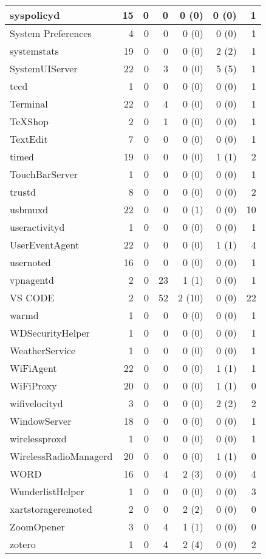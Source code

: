 \begin{adjustwidth}{-2in}{}
\begin{scriptsize}
\begin{longtable}[l]{ l | r | r | r | r | r | r }
    syspolicyd &  15 &  0 &  0 &  0 (0) &  0 (0) &  1 \\ \hline
    System Preferences &  4 &  0 &  0 &  0 (0) &  0 (0) &  1 \\ \hline
    systemstats & 19 &  0 &  0 &  0 (0) &  2 (2) &  1 \\ \hline
    SystemUIServer &  22 &  0 &  3 &  0 (0) &  5 (5) &  1 \\ \hline
    tccd & 1 &  0 &  0 &  0 (0) &  0 (0) &  1 \\ \hline
    Terminal &  22 &  0 &  4 &  0 (0) &  0 (0) &  1 \\ \hline
    TeXShop &  2 &  0 &  1 &  0 (0) &  0 (0) &  1 \\ \hline
    TextEdit & 7 &  0 &  0 &  0 (0) &  0 (0) &  1 \\ \hline
    timed & 19 &  0 &  0 &  0 (0) &  1 (1) &  2 \\ \hline
    TouchBarServer & 1 &  0 &  0 &  0 (0) &  0 (0) &  1 \\ \hline
    trustd & 8 &  0 &  0 &  0 (0) &  0 (0) &  2 \\ \hline
    usbmuxd & 22 &  0 &  0 &  0 (1) &  0 (0) & 10 \\ \hline
    useractivityd &  1 &  0 &  0 &  0 (0) &  0 (0) &  1 \\ \hline
    UserEventAgent &  22 &  0 &  0 &  0 (0) &  1 (1) &  4 \\ \hline
    usernoted & 16 &  0 &  0 &  0 (0) &  0 (0) &  1 \\ \hline
    vpnagentd &  2 &  0 & 23 &  1 (1) &  0 (0) &  1 \\ \hline
    VS CODE & 2 &  0 & 52 & 2 (10) &  0 (0) & 22 \\ \hline
    warmd &  1 &  0 &  0 &  0 (0) &  0 (0) &  1 \\ \hline
    WDSecurityHelper & 1 &  0 &  0 &  0 (0) &  0 (0) &  1 \\ \hline
    WeatherService & 1 &  0 &  0 &  0 (0) &  0 (0) &  1 \\ \hline
    WiFiAgent & 22 &  0 &  0 &  0 (0) &  1 (1) &  1 \\ \hline
    WiFiProxy & 20 &  0 &  0 &  0 (0) &  1 (1) &  0 \\ \hline
    wifivelocityd &  3 &  0 &  0 &  0 (0) &  2 (2) &  2 \\ \hline
    WindowServer &  18 &  0 &  0 &  0 (0) &  0 (0) &  1 \\ \hline
    wirelessproxd &  1 &  0 &  0 &  0 (0) &  0 (0) &  1 \\ \hline
    WirelessRadioManagerd & 20 &  0 &  0 &  0 (0) &  1 (1) &  0 \\ \hline
    WORD &  16 &  0 &  4 &  2 (3) &  0 (0) &  4 \\ \hline
    WunderlistHelper & 1 &  0 &  0 &  0 (0) &  0 (0) &  3 \\ \hline
    xartstorageremoted & 2 &  0 &  0 &  2 (2) &  0 (0) &  0 \\ \hline
    ZoomOpener & 3 &  0 &  4 &  1 (1) &  0 (0) &  0 \\ \hline
    zotero & 1 &  0 &  4 &  2 (4) &  0 (0) &  2 \\ \hline


\end{longtable}
\end{scriptsize}
\end{adjustwidth}
